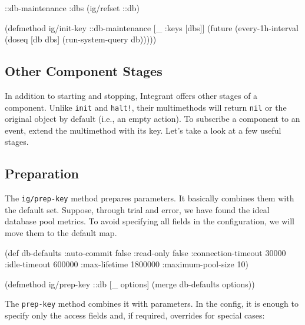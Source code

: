 \else

\begin{english}
  \begin{clojure}
{::db-maintenance {:dbs (ig/refset ::db)}}

(defmethod ig/init-key ::db-maintenance
  [_ {:keys [dbs]}]
  (future
    (every-1h-interval
      (doseq [db dbs]
        (run-system-query db)))))
  \end{clojure}
\end{english}

\fi

\subsection{Other Component Stages}


In addition to starting and stopping, Integrant offers other stages of a component. Unlike \verb|init| and \verb|halt!|, their multimethods will return \verb|nil| or the original object by default (i.e., an empty action). To subscribe a component to an event, extend the multimethod with its key. Let's take a look at a few useful stages.

\subsection{Preparation}

The \verb|ig/prep-key| method prepares parameters. It basically combines them with the default set. Suppose, through trial and error, we have found the ideal database pool metrics. To avoid specifying all fields in the configuration, we will move them to the default map.

\begin{english}
  \begin{clojure}
(def db-defaults
  {:auto-commit        false
   :read-only          false
   :connection-timeout 30000
   :idle-timeout       600000
   :max-lifetime       1800000
   :maximum-pool-size  10})

(defmethod ig/prep-key ::db
  [_ options]
  (merge db-defaults options))
  \end{clojure}
\end{english}

The \verb|prep-key| method combines it with parameters. In the config, it is enough to specify only the access fields and, if required, overrides for special cases:

\ifnarrow

